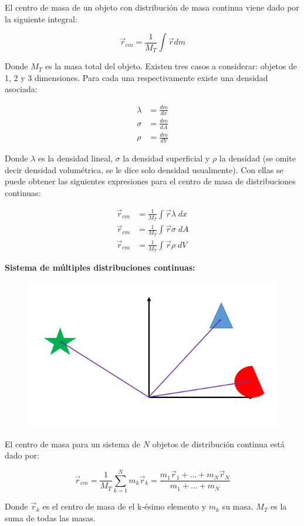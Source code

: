 \documentclass[a4paper,11pt]{article}
\theoremstyle{mytheor}
\begin{document}
El centro de masa de un objeto con distribución de masa continua viene dado por la siguiente integral:

$$  \vec{r}_{cm} = \frac{1}{M_T} \int \vec{r} dm $$

Donde $M_T$ es la masa total del objeto. Existen tres casos a considerar: objetos de 1, 2 y 3 dimensiones. Para cada una respectivamente existe una densidad asociada:

\begin{align*}
\lambda &= \frac{d m}{dx} \\
\sigma &= \frac{d m}{dA} \\
\rho &= \frac{d m}{dV} 
\end{align*}

Donde $\lambda$ es la densidad lineal, $\sigma$ la densidad superficial y $\rho$ la densidad (se omite decir densidad volumétrica, se le dice solo densidad usualmente). Con ellas se puede obtener las siguientes expresiones para el centro de masa de distribuciones continuas:

\begin{align*}
\vec{r}_{cm} &= \frac{1}{M_T} \int \vec{r} \lambda \;dx  \\
\vec{r}_{cm} &= \frac{1}{M_T} \int \vec{r} \sigma \;dA \\
\vec{r}_{cm} &= \frac{1}{M_T} \int \vec{r} \rho\; dV 
\end{align*}


\textbf{Sistema de múltiples distribuciones continuas:}\\



\begin{figure}[h]
	\includegraphics[width=0.5\linewidth]{muchos3d}
	\label{fcN4}
\end{figure}
El centro de masa para un sistema de $N$ objetos de distribución continua está dado por:

$$ \vec{r}_{cm} = \frac{1}{M_{T}}\sum_{k=1}^{N} m_k \vec{r}_k = \frac{m_1\vec{r}_1 + \dots + m_N \vec{r}_N}{m_1 + \dots + m_N}$$


Donde $ \vec{r}_k$ es el centro de masa de el k-ésimo elemento y $m_k$ su masa. $M_T$ es la suma de todas las masas.
\end{document}
